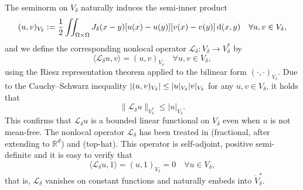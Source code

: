 \documentclass[]{article}
\newcommand{\R}{\mathbb{R}}
\newcommand{\dxy}{\,\textup{d}(x,y)}
\DeclarePairedDelimiter{\abs}{\lvert}{\rvert}
\begin{document}
The seminorm on $V_\delta$ naturally induces the semi-inner product
\begin{equation}
(u,v)_{{V_\delta}} 
:=\frac12 \iint_{\Omega \times \Omega} J_{\delta}(x-y) [u(x)-u(y)] [v(x)-v(y)]  \dxy \quad \forall u,v \in V_\delta,
\label{eq:V_nl_inner}
\end{equation}
and we define the corresponding nonlocal operator \(\mathcal{L}_\delta:V_\delta \to V_\delta^*\) by 
$$\langle  \mathcal{L}_\delta u, v\rangle=(u,v)_{{V_\delta}} \quad \forall u,v \in V_\delta,$$
using the Riesz representation theorem applied to the bilinear form \((\cdot,\cdot)_{V_\delta}\). Due to the Cauchy--Schwarz inequality
\(
|(u,v)_{V_\delta}| \le |u|_{{V_\delta}}\abs{v}_{{V_\delta}}\) for any $u,v \in V_\delta$, it holds that 
\[ \|\mathcal L_\delta u\|_{V_\delta^{*}} \le |u|_{{V_\delta}}.
\]
This confirms that \(\mathcal{L}_\delta u\) is a bounded linear functional on \(V_\delta\) even when \(u\) is not mean-free.
The nonlocal operator $\mathcal L_\delta$ has been treated in \cite[Thm.~4.4 \& discussion preceding §4.4]{du2012analysis} (fractional, after extending to $\R^{d}$) and \cite[§6, eqs.,(6.2)-(6.3)]{gunzburger2010nlvc} (top-hat). This operator is self-adjoint, positive semi-definite and it is easy to verify that $$\langle \mathcal L_\delta u,1 \rangle=(u,1)_{V_\delta} = 0 \quad \forall u \in V_\delta,$$ that is, $\mathcal L_\delta$ vanishes on constant functions and naturally embeds into $\mathring{V}_\delta^*$.
\end{document}
